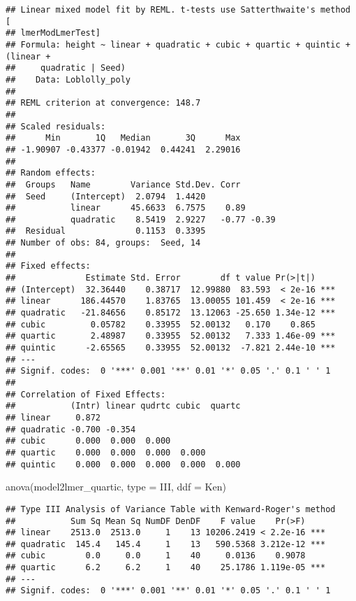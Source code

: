 \documentclass[
]{book}
\newenvironment{Shaded}{\begin{snugshade}}{\end{snugshade}}
\newcommand{\AttributeTok}[1]{\textcolor[rgb]{0.77,0.63,0.00}{#1}}
\newcommand{\FunctionTok}[1]{\textcolor[rgb]{0.00,0.00,0.00}{#1}}
\newcommand{\NormalTok}[1]{#1}
\newcommand{\StringTok}[1]{\textcolor[rgb]{0.31,0.60,0.02}{#1}}
\begin{document}
\begin{verbatim}
## Linear mixed model fit by REML. t-tests use Satterthwaite's method [
## lmerModLmerTest]
## Formula: height ~ linear + quadratic + cubic + quartic + quintic + (linear +  
##     quadratic | Seed)
##    Data: Loblolly_poly
## 
## REML criterion at convergence: 148.7
## 
## Scaled residuals: 
##      Min       1Q   Median       3Q      Max 
## -1.90907 -0.43377 -0.01942  0.44241  2.29016 
## 
## Random effects:
##  Groups   Name        Variance Std.Dev. Corr       
##  Seed     (Intercept)  2.0794  1.4420              
##           linear      45.6633  6.7575    0.89      
##           quadratic    8.5419  2.9227   -0.77 -0.39
##  Residual              0.1153  0.3395              
## Number of obs: 84, groups:  Seed, 14
## 
## Fixed effects:
##              Estimate Std. Error        df t value Pr(>|t|)    
## (Intercept)  32.36440    0.38717  12.99880  83.593  < 2e-16 ***
## linear      186.44570    1.83765  13.00055 101.459  < 2e-16 ***
## quadratic   -21.84656    0.85172  13.12063 -25.650 1.34e-12 ***
## cubic         0.05782    0.33955  52.00132   0.170    0.865    
## quartic       2.48987    0.33955  52.00132   7.333 1.46e-09 ***
## quintic      -2.65565    0.33955  52.00132  -7.821 2.44e-10 ***
## ---
## Signif. codes:  0 '***' 0.001 '**' 0.01 '*' 0.05 '.' 0.1 ' ' 1
## 
## Correlation of Fixed Effects:
##           (Intr) linear qudrtc cubic  quartc
## linear     0.872                            
## quadratic -0.700 -0.354                     
## cubic      0.000  0.000  0.000              
## quartic    0.000  0.000  0.000  0.000       
## quintic    0.000  0.000  0.000  0.000  0.000
\end{verbatim}

\begin{Shaded}
\begin{Highlighting}[]
\FunctionTok{anova}\NormalTok{(model2lmer\_quartic, }\AttributeTok{type =} \StringTok{\textquotesingle{}III\textquotesingle{}}\NormalTok{, }\AttributeTok{ddf =} \StringTok{\textquotesingle{}Ken\textquotesingle{}}\NormalTok{)}
\end{Highlighting}
\end{Shaded}

\begin{verbatim}
## Type III Analysis of Variance Table with Kenward-Roger's method
##           Sum Sq Mean Sq NumDF DenDF    F value    Pr(>F)    
## linear    2513.0  2513.0     1    13 10206.2419 < 2.2e-16 ***
## quadratic  145.4   145.4     1    13   590.5368 3.212e-12 ***
## cubic        0.0     0.0     1    40     0.0136    0.9078    
## quartic      6.2     6.2     1    40    25.1786 1.119e-05 ***
## ---
## Signif. codes:  0 '***' 0.001 '**' 0.01 '*' 0.05 '.' 0.1 ' ' 1
\end{verbatim}
\end{document}

